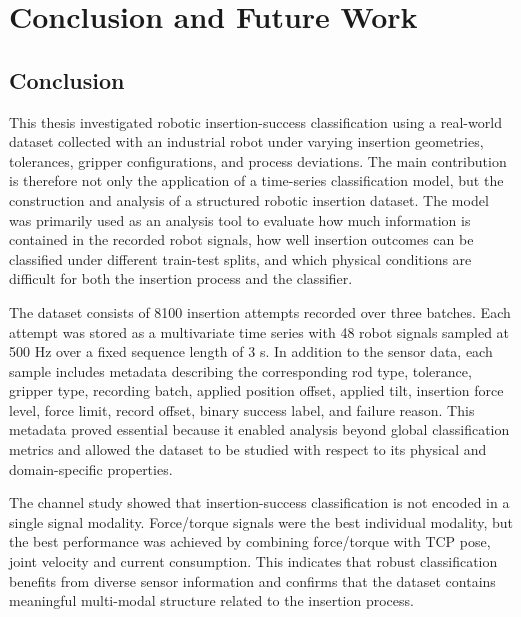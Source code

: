 \chapter{Conclusion and Future Work}\label{ch:conclusion}


\section{Conclusion}
\label{sec}



This thesis investigated robotic insertion-success classification using a real-world dataset collected with an industrial robot under varying insertion geometries, tolerances, gripper configurations, and process deviations. The main contribution is therefore not only the application of a time-series classification model, but the construction and analysis of a structured robotic insertion dataset. The model was primarily used as an analysis tool to evaluate how much information is contained in the recorded robot signals, how well insertion outcomes can be classified under different train-test splits, and which physical conditions are difficult for both the insertion process and the classifier.

The dataset consists of 8100 insertion attempts recorded over three batches. Each attempt was stored as a multivariate time series with 48 robot signals sampled at 500 Hz over a fixed sequence length of 3 s. In addition to the sensor data, each sample includes metadata describing the corresponding rod type, tolerance, gripper type, recording batch, applied position offset, applied tilt, insertion force level, force limit, record offset, binary success label, and failure reason. This metadata proved essential because it enabled analysis beyond global classification metrics and allowed the dataset to be studied with respect to its physical and domain-specific properties.

The channel study showed that insertion-success classification is not encoded in a single signal modality. Force/torque signals were the best individual modality, but the best performance was achieved by combining force/torque with TCP pose, joint velocity and current consumption. This indicates that robust classification benefits from diverse sensor information and confirms that the dataset contains meaningful multi-modal structure related to the insertion process.


